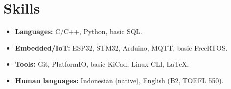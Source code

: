 \section{Skills}
\begin{itemize}
  \item \textbf{Languages:} C/C++, Python, basic SQL.
  \item \textbf{Embedded/IoT:} ESP32, STM32, Arduino, MQTT, basic FreeRTOS.
  \item \textbf{Tools:} Git, PlatformIO, basic KiCad, Linux CLI, LaTeX.
  \item \textbf{Human languages:} Indonesian (native), English (B2, TOEFL 550).
\end{itemize}
